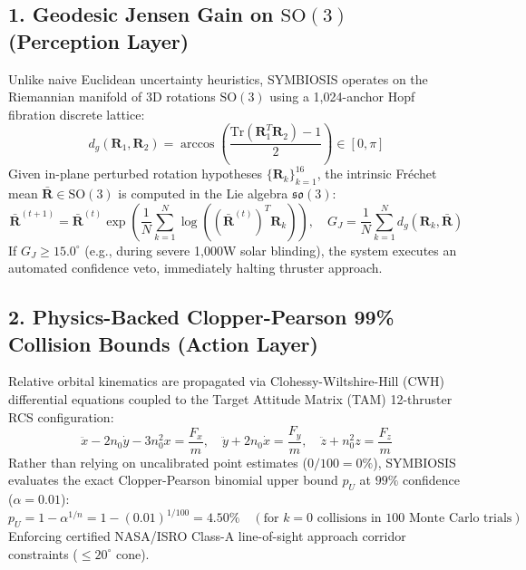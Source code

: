 \documentclass[11pt,a4paper]{article}
\begin{document}
\subsection{1. Geodesic Jensen Gain on $\mathrm{SO}(3)$ (Perception Layer)}
Unlike naive Euclidean uncertainty heuristics, SYMBIOSIS operates on the Riemannian manifold of 3D rotations $\mathrm{SO}(3)$ using a 1,024-anchor Hopf fibration discrete lattice:
\begin{equation}
d_g(\mathbf{R}_1, \mathbf{R}_2) = \arccos\left(\frac{\mathrm{Tr}(\mathbf{R}_1^T \mathbf{R}_2) - 1}{2}\right) \in [0, \pi]
\end{equation}
Given in-plane perturbed rotation hypotheses $\{\mathbf{R}_k\}_{k=1}^{16}$, the intrinsic Fréchet mean $\bar{\mathbf{R}} \in \mathrm{SO}(3)$ is computed in the Lie algebra $\mathfrak{so}(3)$:
\begin{equation}
\bar{\mathbf{R}}^{(t+1)} = \bar{\mathbf{R}}^{(t)} \exp\left( \frac{1}{N}\sum_{k=1}^N \log\left( (\bar{\mathbf{R}}^{(t)})^T \mathbf{R}_k \right) \right), \quad G_J = \frac{1}{N}\sum_{k=1}^N d_g(\mathbf{R}_k, \bar{\mathbf{R}})
\end{equation}
If $G_J \ge 15.0^\circ$ (e.g., during severe 1,000W solar blinding), the system executes an automated confidence veto, immediately halting thruster approach.

\subsection{2. Physics-Backed Clopper-Pearson 99\% Collision Bounds (Action Layer)}
Relative orbital kinematics are propagated via Clohessy-Wiltshire-Hill (CWH) differential equations coupled to the Target Attitude Matrix (TAM) 12-thruster RCS configuration:
\begin{equation}
\ddot{x} - 2n_0\dot{y} - 3n_0^2 x = \frac{F_x}{m}, \quad \ddot{y} + 2n_0\dot{x} = \frac{F_y}{m}, \quad \ddot{z} + n_0^2 z = \frac{F_z}{m}
\end{equation}
Rather than relying on uncalibrated point estimates ($0/100 = 0\%$), SYMBIOSIS evaluates the exact Clopper-Pearson binomial upper bound $p_U$ at $99\%$ confidence ($\alpha=0.01$):
\begin{equation}
p_U = 1 - \alpha^{1/n} = 1 - (0.01)^{1/100} = 4.50\% \quad (\text{for } k=0 \text{ collisions in } 100 \text{ Monte Carlo trials})
\end{equation}
Enforcing certified NASA/ISRO Class-A line-of-sight approach corridor constraints ($\le 20^\circ$ cone).
\end{document}
